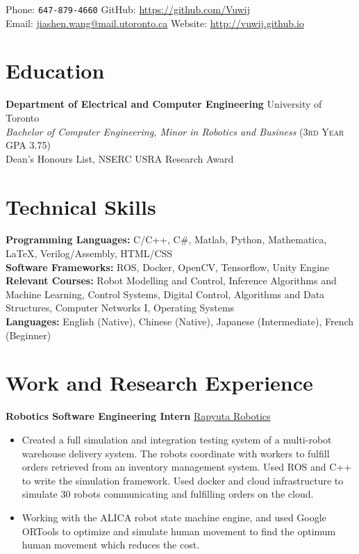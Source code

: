 \documentclass[10pt, a4paper]{cv}
\renewcommand*{\name}{\fontsize{24}{40}\mdseries\upshape}
\begin{document}
\begin{center}
\name{Jason Wang}
\end{center}

Phone: \texttt{647-879-4660} \hfill
GitHub: \href{https://github.com/Vuwij}{https://github.com/Vuwij}\\
Email: \href{mailto:jiashen.wang@mail.utoronto.ca}{jiashen.wang@mail.utoronto.ca}\hfill
Website: \href{http://vuwij.github.io}{http://vuwij.github.io}

\section*{Education}
\textbf{Department of Electrical and Computer Engineering} \hfill University of Toronto\\
\emph{Bachelor of Computer Engineering, Minor in Robotics and Business} \small{\textsc{(3rd Year GPA 3.75)}}\\[0.1mm]
\small Dean's Honours List, NSERC USRA Research Award

\section*{Technical Skills}
\textbf{Programming Languages:} C/C++, C\#, Matlab, Python, Mathematica, \LaTeX, Verilog/Assembly, HTML/CSS\\[0.2em]
\textbf{Software Frameworks:} ROS, Docker, OpenCV, Tensorflow, Unity Engine\\[0.2em]
\textbf{Relevant Courses:} Robot Modelling and Control, Inference Algorithms and Machine Learning, Control Systems, Digital Control, Algorithms and Data Structures, Computer Networks I, Operating Systems \\
\textbf{Languages:} English (Native), Chinese (Native), Japanese (Intermediate), French (Beginner)
\section*{Work and Research Experience}\noindent
	\textbf{Robotics Software Engineering Intern} \hfill \href{https://www.rapyuta-robotics.com}{Rapyuta Robotics}
	\begin{itemize}
		\item Created a full simulation and integration testing system of a multi-robot warehouse delivery system. The robots coordinate with workers to fulfill orders retrieved from an inventory management system. Used ROS and C++ to write the simulation framework. Used docker and cloud infrastructure to simulate 30 robots communicating and fulfilling orders on the cloud.
		\item Working with the ALICA robot state machine engine, and used Google ORTools to optimize and simulate human movement to find the optimum human movement which reduces the cost.
	\end{itemize}
\end{document}
